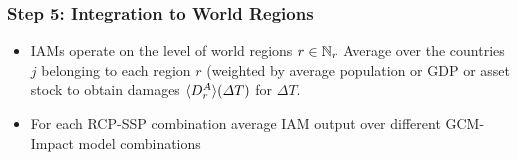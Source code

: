 \documentclass[
c,
11pt,
aspectratio=169, %
final,
]{beamer}
\begin{document}
\begin{frame}
  \frametitle{Step 5: Integration to World Regions}
  \begin{itemize}
  \item IAMs operate on the level of world regions $r\in\mathbb{N}_r$
    \arrowitem Average over the countries $j$ belonging to each region $r$ (weighted by average population or GDP or asset stock to obtain damages $\langle D^A_{r}\rangle(\Delta T)$ for $\Delta T$.
  \end{itemize}

  \begin{itemize}
  \item For each RCP-SSP combination average IAM output over different GCM-Impact model combinations
  \end{itemize}
  
\end{frame}
\end{document}
